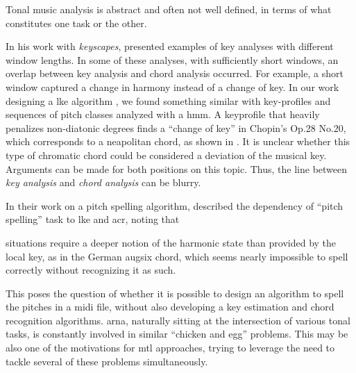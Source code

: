 

Tonal music analysis is abstract and often not well defined,
in terms of what constitutes one task or the other.


In his work with \emph{keyscapes},
\textcite{sapp2011computational} presented examples of key
analyses with different window lengths. In some of these
analyses, with sufficiently short windows, an overlap
between key analysis and chord analysis occurred. For
example, a short window captured a change in harmony instead
of a change of key. In our work designing a \gls{lke}
algorithm \parencite{napoleslopez2019keyfinding}, we found
something similar with key-profiles and sequences of pitch
classes analyzed with a \gls{hmm}. A \gls{keyprofile} that
heavily penalizes non-diatonic degrees finds a ``change of
key'' in Chopin's Op.28 No.20, which corresponds to a
\gls{neapolitan} chord, as shown in . It is
unclear whether this type of chromatic chord could be
considered a deviation of the musical key. Arguments can be
made for both positions on this topic. Thus, the line
between \emph{key analysis} and \emph{chord analysis} can be
blurry.



In their work on a pitch spelling algorithm,
\textcite{teodoru2007pitch} described the dependency of
``pitch spelling'' task to \gls{lke} and \gls{acr}, noting
that 

\begin{italicsquote}
 situations require a deeper notion of the
harmonic state than provided by the local key, as in the
German \gls{augsix} chord, which seems nearly impossible to
spell correctly without recognizing it as such.
\end{italicsquote}

This poses the question of whether it is possible to design
an algorithm to spell the pitches in a \gls{midi} file,
without also developing a key estimation and chord
recognition algorithms. \gls{arna}, naturally sitting at the
intersection of various tonal tasks, is constantly involved
in similar ``chicken and egg'' problems. This may be also
one of the motivations for \gls{mtl} approaches, trying to
leverage the need to tackle several of these problems
simultaneously.
